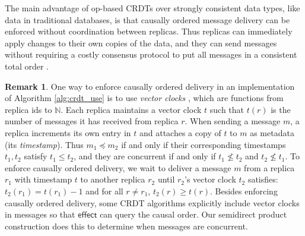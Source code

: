 \documentclass[acmsmall,nonacm,12pt]{acmart}
\newcommand{\mb}[1]{\ensuremath{\mathbb{#1}}}
\newcommand{\msf}[1]{\ensuremath{\mathsf{#1}}}
\newcommand{\N}{\mb{N}}
\theoremstyle{plain}
\theoremstyle{definition}
\newtheorem{myrmk}[mythm]{Remark}
\begin{document}
The main advantage of op-based CRDTs over strongly consistent data types, like data in traditional databases, is that causally ordered message delivery can be enforced without coordination between replicas.  Thus replicas can immediately apply changes to their own copies of the data, and they can send messages without requiring a costly consensus protocol to put all messages in a consistent total order \cite{total_order_survey}.

\begin{myrmk}
One way to enforce causally ordered delivery in an implementation of Algorithm \ref{alg:crdt_use} is to use \textit{vector clocks} \cite{fidge, mattern}, which are functions from replica ids to $\N$.  Each replica maintains a vector clock $t$ such that $t(r)$ is the number of messages it has received from replica $r$.  When sending a message $m$, a replica increments its own entry in $t$ and attaches a copy of $t$ to $m$ as metadata (its \textit{timestamp}).  Thus $m_1 \preceq m_2$ if and only if their corresponding timestamps $t_1, t_2$ satisfy $t_1 \leq t_2$, and they are concurrent if and only if $t_1 \nleq t_2$ and $t_2 \nleq t_1$.  To enforce causally ordered delivery, we wait to deliver a message $m$ from a replica $r_1$ with timestamp $t$ to another replica $r_2$ until $r_2$'s vector clock $t_2$ satisfies: $t_2(r_1) = t(r_1) - 1$ and for all $r \neq r_1$, $t_2(r) \ge t(r)$.  Besides enforcing causally ordered delivery, some CRDT algorithms explicitly include vector clocks in messages so that $\msf{effect}$ can query the causal order.  Our semidirect product construction does this to determine when messages are concurrent.
\end{myrmk}


\end{document}
